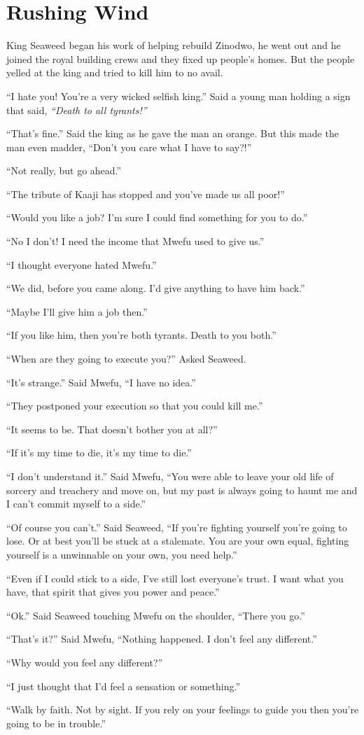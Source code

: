 \section{Rushing Wind}

King Seaweed began his work of helping rebuild Zinodwo, he went out and he joined the royal building crews and they fixed up people's homes. But the people yelled at the king and tried to kill him to no avail.

``I hate you! You're a very wicked selfish king.''
Said a young man holding a sign that said, \emph{``Death to all tyrants!''}

``That's fine.'' Said the king as he gave the man an orange. But this made the man even madder, ``Don't you care what I have to say?!''

``Not really, but go ahead.''

``The tribute of Kaaji has stopped and you've made us all poor!''

``Would you like a job? I'm sure I could find something for you to do.''

``No I don't! I need the income that Mwefu used to give us.''

``I thought everyone hated Mwefu.''

``We did, before you came along. I'd give anything to have him back.''

``Maybe I'll give him a job then.''

``If you like him, then you're both tyrants. Death to you both.''

\tbreak

``When are they going to execute you?'' Asked Seaweed.

``It's strange.'' Said Mwe\-fu, ``I have no idea.''

``They postponed your execution so that you could kill me.''

``It seems to be. That doesn't bother you at all?''

``If it's my time to die, it's my time to die.''

``I don't understand it.'' Said Mwe\-fu, ``You were able to leave your old life of sorcery and treachery and move on, but my past is always going to haunt me and I can't commit myself to a side.''

``Of course you can't.'' Said Seaweed, ``If you're fighting yourself you're going to lose. Or at best you'll be stuck at a stalemate. You are your own equal, fighting yourself is a unwinnable on your own, you need help.''

``Even if I could stick to a side, I've still lost everyone's trust. I want what you have, that spirit that gives you power and peace.''

``Ok.'' Said Seaweed touching Mwe\-fu on the shoulder, ``There you go.''

``That's it?'' Said Mwe\-fu, ``Nothing happened. I don't feel any different.''

``Why would you feel any different?''

``I just thought that I'd feel a sensation or something.''

``Walk by faith. Not by sight. If you rely on your feelings to guide you then you're going to be in trouble.''


